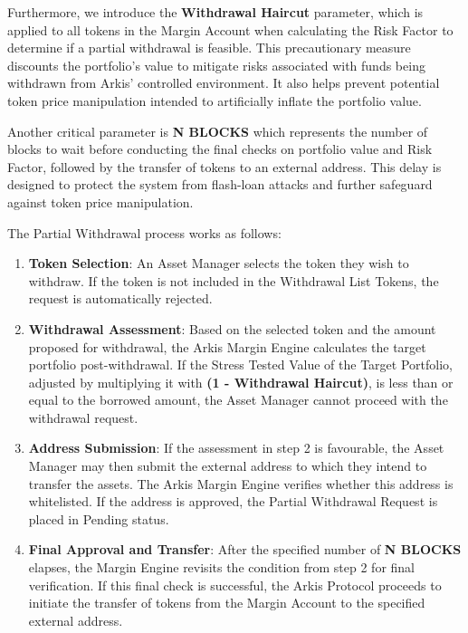 \documentclass[conference]{IEEEtran}
\begin{document}
Furthermore, we introduce the \textbf{Withdrawal Haircut} parameter, which is applied to all tokens in the Margin Account when calculating the Risk Factor to determine if a partial withdrawal is feasible. This precautionary measure discounts the portfolio's value to mitigate risks associated with funds being withdrawn from Arkis’ controlled environment. It also helps prevent potential token price manipulation intended to artificially inflate the portfolio value.

Another critical parameter is \textbf{N BLOCKS} which represents the number of blocks to wait before conducting the final checks on portfolio value and Risk Factor, followed by the transfer of tokens to an external address. This delay is designed to protect the system from flash-loan attacks and further safeguard against token price manipulation.

The Partial Withdrawal process works as follows:
\begin{enumerate}
	\item \textbf{Token Selection}: An Asset Manager selects the token they wish to withdraw. If the token is not included in the Withdrawal List Tokens, the request is automatically rejected.
	\item \textbf{Withdrawal Assessment}: Based on the selected token and the amount proposed for withdrawal, the Arkis Margin Engine calculates the target portfolio post-withdrawal. If the Stress Tested Value of the Target Portfolio, adjusted by multiplying it with \textbf{(1 - Withdrawal Haircut)}, is less than or equal to the borrowed amount, the Asset Manager cannot proceed with the withdrawal request.
	\item \textbf{Address Submission}: If the assessment in step 2 is favourable, the Asset Manager may then submit the external address to which they intend to transfer the assets. The Arkis Margin Engine verifies whether this address is whitelisted. If the address is approved, the Partial Withdrawal Request is placed in Pending status.
	\item \textbf{Final Approval and Transfer}: After the specified number of \textbf{N BLOCKS} elapses, the Margin Engine revisits the condition from step 2 for final verification. If this final check is successful, the Arkis Protocol proceeds to initiate the transfer of tokens from the Margin Account to the specified external address.

\end{enumerate}
\end{document}
